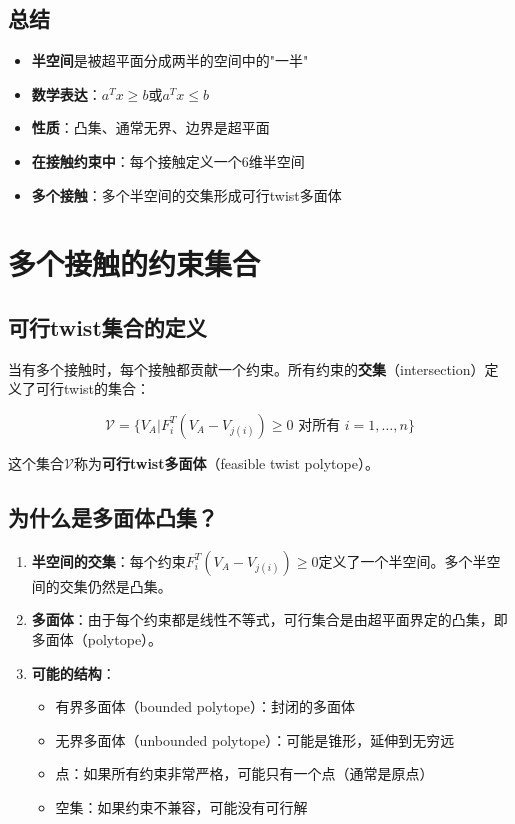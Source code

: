 \documentclass[12pt,a4paper]{article}
\begin{document}
\subsection{总结}

\begin{itemize}
\item \textbf{半空间}是被超平面分成两半的空间中的"一半"
\item \textbf{数学表达}：$a^T x \geq b$或$a^T x \leq b$
\item \textbf{性质}：凸集、通常无界、边界是超平面
\item \textbf{在接触约束中}：每个接触定义一个6维半空间
\item \textbf{多个接触}：多个半空间的交集形成可行twist多面体
\end{itemize}

\section{多个接触的约束集合}

\subsection{可行twist集合的定义}

当有多个接触时，每个接触都贡献一个约束。所有约束的\textbf{交集}（intersection）定义了可行twist的集合：

\begin{equation}
\mathcal{V} = \{V_A | F_i^T (V_A - V_{j(i)}) \geq 0 \text{ 对所有 } i = 1, \ldots, n\}
\label{eq:feasible_set}
\end{equation}

这个集合$\mathcal{V}$称为\textbf{可行twist多面体}（feasible twist polytope）。

\subsection{为什么是多面体凸集？}

\begin{enumerate}
\item \textbf{半空间的交集}：每个约束$F_i^T (V_A - V_{j(i)}) \geq 0$定义了一个半空间。多个半空间的交集仍然是凸集。

\item \textbf{多面体}：由于每个约束都是线性不等式，可行集合是由超平面界定的凸集，即多面体（polytope）。

\item \textbf{可能的结构}：
  \begin{itemize}
  \item 有界多面体（bounded polytope）：封闭的多面体
  \item 无界多面体（unbounded polytope）：可能是锥形，延伸到无穷远
  \item 点：如果所有约束非常严格，可能只有一个点（通常是原点）
  \item 空集：如果约束不兼容，可能没有可行解
  \end{itemize}
\end{enumerate}
\end{document}
